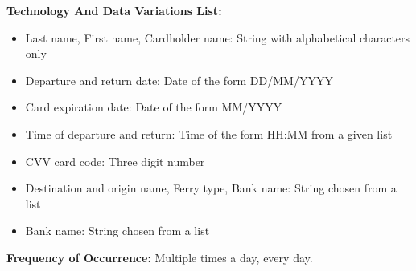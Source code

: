 \textbf{Technology And Data Variations List:} 
\begin{itemize}
    \item Last name, First name, Cardholder name: String with alphabetical characters only
    \item Departure and return date: Date of the form DD/MM/YYYY
    \item Card expiration date: Date of the form MM/YYYY
    \item Time of departure and return: Time of the form HH:MM from a given list
    \item CVV card code: Three digit number
    \item Destination and origin name, Ferry type, Bank name: String chosen from a list
    \item Bank name: String chosen from a list
    \end{itemize}

\textbf{Frequency of Occurrence:} Multiple times a day, every day.

